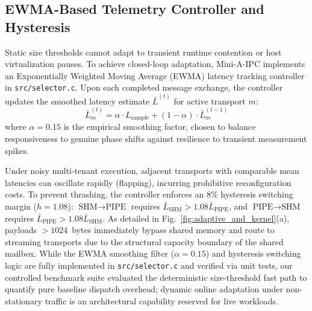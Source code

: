 \subsection{EWMA-Based Telemetry Controller and Hysteresis}
Static size thresholds cannot adapt to transient runtime contention or host virtualization pauses. To achieve closed-loop adaptation, Mini-A-IPC implements an Exponentially Weighted Moving Average (EWMA) latency tracking controller in \texttt{src/selector.c}. 
Upon each completed message exchange, the controller updates the smoothed latency estimate $\bar{L}^{(t)}$ for active transport $m$:
\begin{equation}
\bar{L}^{(t)}_m = \alpha \cdot L_{\text{sample}} + (1 - \alpha) \cdot \bar{L}^{(t-1)}_m
\end{equation}
where $\alpha = 0.15$ is the empirical smoothing factor, chosen to balance responsiveness to genuine phase shifts against resilience to transient measurement spikes.

Under noisy multi-tenant execution, adjacent transports with comparable mean latencies can oscillate rapidly (flapping), incurring prohibitive reconfiguration costs. To prevent thrashing, the controller enforces an 8\% hysteresis switching margin ($h = 1.08$): $\text{SHM} \to \text{PIPE}$ requires $\bar{L}_{\text{SHM}} > 1.08 \bar{L}_{\text{PIPE}}$, and $\text{PIPE} \to \text{SHM}$ requires $\bar{L}_{\text{PIPE}} > 1.08 \bar{L}_{\text{SHM}}$.
As detailed in Fig.~\ref{fig:adaptive_and_kernel}(a), payloads $> 1024$~bytes immediately bypass shared memory and route to streaming transports due to the structural capacity boundary of the shared mailbox. While the EWMA smoothing filter ($\alpha = 0.15$) and hysteresis switching logic are fully implemented in \texttt{src/selector.c} and verified via unit tests, our controlled benchmark suite evaluated the deterministic size-threshold fast path to quantify pure baseline dispatch overhead; dynamic online adaptation under non-stationary traffic is an architectural capability reserved for live workloads.

